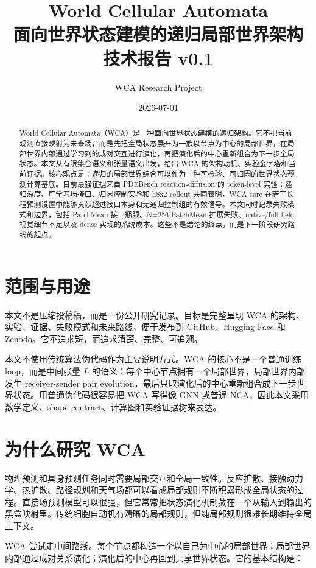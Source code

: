 \documentclass[11pt]{article}
\title{\textbf{World Cellular Automata}\\
\large 面向世界状态建模的递归局部世界架构\\
\normalsize 技术报告 v0.1}
\author{WCA Research Project}
\date{2026-07-01}
\begin{document}
\maketitle

\begin{abstract}
World Cellular Automata（WCA）是一种面向世界状态建模的递归架构。它不把当前观测直接映射为未来场，而是先把全局状态展开为一族以节点为中心的局部世界，在局部世界内部通过学习到的成对交互进行演化，再把演化后的中心重新组合为下一步全局状态。本文从有限集合语义和张量语义出发，给出 WCA 的架构动机、实验金字塔和当前证据。核心观点是：递归的局部世界综合可以作为一种可检验、可归因的世界状态预测计算基底。目前最强证据来自 PDEBench reaction-diffusion 的 token-level 实验；递归深度、可学习场接口、归因控制实验和 h8x2 rollout 共同表明，WCA core 在若干长程预测设置中能够贡献超过接口本身和无递归控制组的有效信号。本文同时记录失败模式和边界，包括 PatchMean 接口瓶颈、N=256 PatchMean 扩展失败、native/full-field 视觉细节不足以及 dense 实现的系统成本。这些不是结论的终点，而是下一阶段研究路线的起点。
\end{abstract}

\tableofcontents
\newpage

\section{范围与用途}

本文不是压缩投稿稿，而是一份公开研究记录。目标是完整呈现 WCA 的架构、实验、证据、失败模式和未来路线，便于发布到 GitHub、Hugging Face 和 Zenodo。它不追求短，而追求清楚、完整、可追溯。

本文不使用传统算法伪代码作为主要说明方式。WCA 的核心不是一个普通训练 loop，而是中间张量 $L$ 的语义：每个中心节点拥有一个局部世界，局部世界内部发生 receiver-sender pair evolution，最后只取演化后的中心重新组合成下一步世界状态。用普通伪代码很容易把 WCA 写得像 GNN 或普通 NCA，因此本文采用数学定义、shape contract、计算图和实验证据树来表达。

\section{为什么研究 WCA}

物理预测和具身预测任务同时需要局部交互和全局一致性。反应扩散、接触动力学、热扩散、路径规划和天气场都可以看成局部规则不断积累形成全局状态的过程。直接场预测模型可以很强，但它常常把状态演化机制藏在一个从输入到输出的黑盒映射里。传统细胞自动机有清晰的局部规则，但纯局部规则很难长期维持全局上下文。

WCA 尝试走中间路线。每个节点都构造一个以自己为中心的局部世界；局部世界内部通过成对关系演化；演化后的中心再回到共享世界状态。它的基本结构是：
\end{document}
